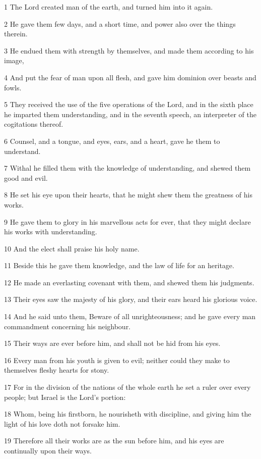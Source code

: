 \par 1 The Lord created man of the earth, and turned him into it again.
\par 2 He gave them few days, and a short time, and power also over the things therein.
\par 3 He endued them with strength by themselves, and made them according to his image,
\par 4 And put the fear of man upon all flesh, and gave him dominion over beasts and fowls.
\par 5 They received the use of the five operations of the Lord, and in the sixth place he imparted them understanding, and in the seventh speech, an interpreter of the cogitations thereof.
\par 6 Counsel, and a tongue, and eyes, ears, and a heart, gave he them to understand.
\par 7 Withal he filled them with the knowledge of understanding, and shewed them good and evil.
\par 8 He set his eye upon their hearts, that he might shew them the greatness of his works.
\par 9 He gave them to glory in his marvellous acts for ever, that they might declare his works with understanding.
\par 10 And the elect shall praise his holy name.
\par 11 Beside this he gave them knowledge, and the law of life for an heritage.
\par 12 He made an everlasting covenant with them, and shewed them his judgments.
\par 13 Their eyes saw the majesty of his glory, and their ears heard his glorious voice.
\par 14 And he said unto them, Beware of all unrighteousness; and he gave every man commandment concerning his neighbour.
\par 15 Their ways are ever before him, and shall not be hid from his eyes.
\par 16 Every man from his youth is given to evil; neither could they make to themselves fleshy hearts for stony.
\par 17 For in the division of the nations of the whole earth he set a ruler over every people; but Israel is the Lord's portion:
\par 18 Whom, being his firstborn, he nourisheth with discipline, and giving him the light of his love doth not forsake him.
\par 19 Therefore all their works are as the sun before him, and his eyes are continually upon their ways.
